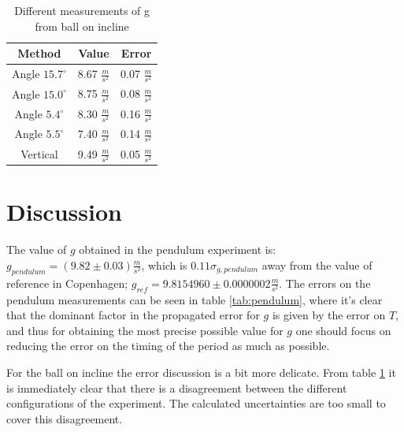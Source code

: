 \documentclass[a4paper,%
               aps,%
               prl,%
               amsfonts,%
               amssymb,%
               amsmath,%
               nobibnotes,%
               twocolumn, %
               twoside,%
               balancelastpage,%
               eqsecnum] %
               {revtex4-1}
\begin{document}
\begin{table}[H]
\centering
    \begin{tabular}{||c c c||}
        \hline
         Method & Value & Error \\ 
        \hline\hline
        Angle $15.7 ^\circ$ & 8.67 $\frac{m}{s^2}$ & 0.07 $\frac{m}{s^2}$\\
        \hline
        Angle $15.0 ^\circ$ & 8.75 $\frac{m}{s^2}$ & 0.08 $\frac{m}{s^2}$\\
        \hline
        Angle $5.4 ^\circ$ & 8.30 $\frac{m}{s^2}$ & 0.16 $\frac{m}{s^2}$\\
        \hline
        Angle $5.5 ^\circ$ & 7.40 $\frac{m}{s^2}$ & 0.14 $\frac{m}{s^2}$\\
        \hline
        Vertical & 9.49 $\frac{m}{s^2}$ & 0.05 $\frac{m}{s^2}$\\
        \hline
    \end{tabular}
    \caption{Different measurements of g from ball on incline}
    \label{tab:g_incline}
\end{table}



\section{Discussion}


The value of $g$ obtained in the pendulum experiment is:  $g_{pendulum}=(9.82 \pm 0.03)\frac{m}{s^2}$, which is $0.11  \sigma_{g,pendulum}$ away from the value of reference in Copenhagen; $g_{ref}= 9.81 54960 \pm 0.0000002 \frac{m}{s^2} $\cite{DTU}.
The errors on the pendulum measurements can be seen in table \ref{tab:pendulum}, where it's clear that the dominant factor in the propagated error for $g$ is given by the error on $T$, and thus for obtaining the most precise possible value for $g$ one should focus on reducing the error on the timing of the period as much as possible.

For the ball on incline the error discussion is a bit more delicate.
From table \ref{tab:g_incline} it is immediately clear that there is a disagreement between the different configurations of the experiment.
The calculated uncertainties are too small to cover this disagreement.
\end{document}
